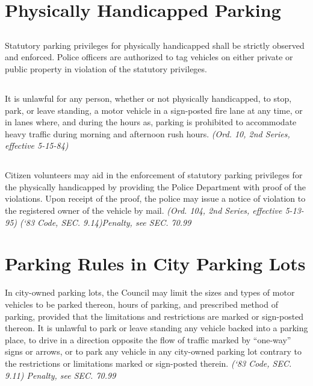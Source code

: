 \section{Physically Handicapped Parking}
\subsection{}
Statutory parking privileges for physically handicapped shall be strictly observed and enforced.  Police officers are authorized to tag vehicles on either private or public property in violation of the statutory privileges.
\subsection{}
It is unlawful for any person, whether or not physically handicapped, to stop, park, or leave standing, a motor vehicle in a sign-posted fire lane at any time, or in lanes where, and during the hours as, parking is prohibited to accommodate heavy traffic during morning and afternoon rush hours. \emph{(Ord. 10, 2nd Series, effective 5-15-84)}
\subsection{}
Citizen volunteers may aid in the enforcement of statutory parking privileges for the physically handicapped by providing the Police Department with proof of the violations.  Upon receipt of the proof, the police may issue a notice of violation to the registered owner of the vehicle by mail. \emph{(Ord. 104, 2nd Series, effective 5-13-95)}\newline
\emph{(‘83 Code, SEC. 9.14)Penalty, see SEC. 70.99}

\section{Parking Rules in City Parking Lots}
In city-owned parking lots, the Council may limit the sizes and types of motor vehicles to be parked thereon, hours of parking, and prescribed method of parking, provided that the limitations and restrictions are marked or sign-posted thereon.  It is unlawful to park or leave standing any vehicle backed into a parking place, to drive in a direction opposite the flow of traffic marked by “one-way” signs or arrows, or to park any vehicle in any city-owned parking lot contrary to the restrictions or limitations marked or sign-posted therein.\newline
\emph{(‘83 Code, SEC. 9.11)  Penalty, see SEC. 70.99}

